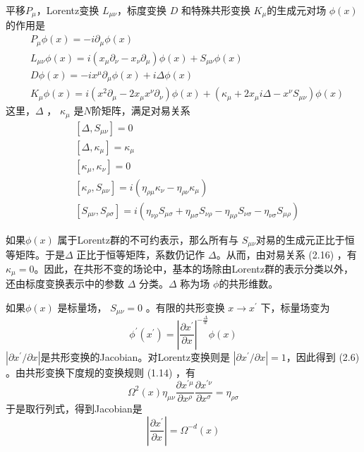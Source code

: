 平移$P_\mu $，Lorentz变换 $L_{\mu\nu} $，标度变换 $D$ 和特殊共形变换 $K_\mu $的生成元对场 $\phi(x)$ 的作用是
\begin{align} &P_{\mu} \phi(x)=-i \partial_{\mu} \phi(x)\\ &L_{\mu \nu} \phi(x)=i\left(x_{\mu} \partial_{\nu}-x_{\nu} \partial_{\mu}\right) \phi(x)+S_{\mu \nu} \phi(x)\\ &D \phi(x)=-i x^{\mu} \partial_{\mu} \phi(x)+i \Delta \phi(x)\\ &K_{\mu} \phi(x)=i\left(x^{2} \partial_{\mu}-2 x_{\mu} x^{\nu} \partial_{\nu}\right) \phi(x) +\left(\kappa_{\mu}+2 x_{\mu} i \Delta-x^{\nu} S_{\mu \nu}\right) \phi(x) \end{align}
这里，$ \Delta$ ， $\kappa_\mu$ 是$ N $阶矩阵，满足对易关系
\begin{align} &\left[\Delta, S_{\mu \nu}\right]=0 \\ &\left[\Delta, \kappa_{\mu}\right]=\kappa_{\mu} \\ &\left[\kappa_{\mu}, \kappa_{\nu}\right]=0\\ &\left[\kappa_{\rho}, S_{\mu \nu}\right]=i\left( \eta_{\rho \mu} \kappa_{\nu}-\eta_{\rho \nu} \kappa_{\mu}\right) \\ &\left[S_{\mu \nu}, S_{\rho \sigma}\right]=i\left(\eta_{\nu \rho} S_{\mu \sigma}+\eta_{\mu \sigma} S_{\nu \rho}-\eta_{\mu \rho} S_{\nu \sigma}-\eta_{\nu \sigma} S_{\mu \rho}\right) \end{align}

如果$ \phi(x)$ 属于Lorentz群的不可约表示，那么所有与 $S_{\mu\nu} $对易的生成元正比于恒等矩阵。于是$ \Delta$ 正比于恒等矩阵，系数仍记作 $\Delta $。从而，由对易关系 (2.16) ，有 $\kappa_\mu=0 $。因此，在共形不变的场论中，基本的场除由Lorentz群的表示分类以外，还由标度变换表示中的参数 $\Delta$ 分类。$ \Delta$ 称为场 $\phi $的共形维数。

如果$ \phi(x)$ 是标量场， $S_{\mu\nu}=0$ 。有限的共形变换 $x\to x^\prime$ 下，标量场变为
\begin{equation}
		\phi^{\prime}\left(x^{\prime}\right)=\left|\frac{\partial x^{\prime}}{\partial x}\right|^{-\frac{\Delta}{d}} \phi(x)
\end{equation}
$| \partial x^{\prime}/\partial x |$是共形变换的Jacobian。对Lorentz变换则是 $| \partial x^{\prime}/\partial x |=1 $，因此得到 (2.6) 。由共形变换下度规的变换规则 (1.14) ，有
\begin{equation}
	\Omega^{2}(x) \eta_{\mu \nu} \frac{\partial x^{\prime \mu}}{\partial x^{\rho}} \frac{\partial x^{\prime \nu}}{\partial x^{\sigma}}=\eta_{\rho \sigma}
\end{equation}
于是取行列式，得到Jacobian是
\begin{equation}
	\left|\frac{\partial x^{\prime}}{\partial x}\right|=\Omega^{-d}(x)
\end{equation}

